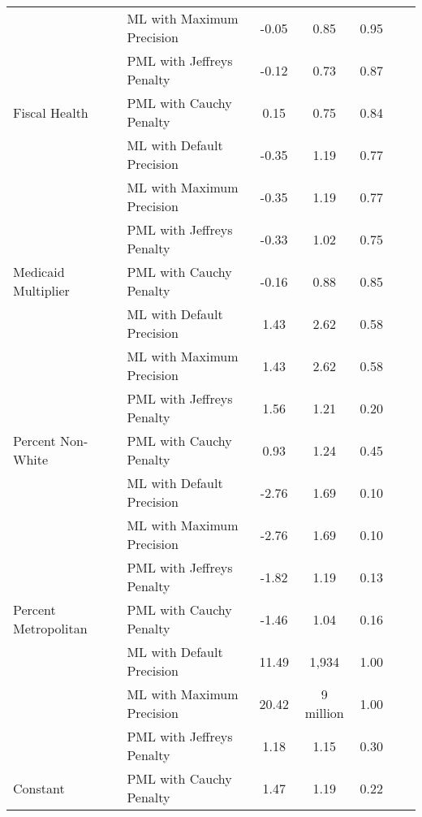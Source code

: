 \begin{tabular}{llccccc}
 & ML with Maximum Precision & -0.05 & 0.85 & 0.95 &  & \\

 & PML with Jeffreys Penalty & -0.12 & 0.73 & 0.87 &  & \\

\multirow{-4}{*}{\raggedright\arraybackslash Fiscal Health} & PML with Cauchy Penalty & 0.15 & 0.75 & 0.84 &  & \\
\cmidrule{1-7}
 & ML with Default Precision & -0.35 & 1.19 & 0.77 &  & \\

 & ML with Maximum Precision & -0.35 & 1.19 & 0.77 &  & \\

 & PML with Jeffreys Penalty & -0.33 & 1.02 & 0.75 &  & \\

\multirow{-4}{*}{\raggedright\arraybackslash Medicaid Multiplier} & PML with Cauchy Penalty & -0.16 & 0.88 & 0.85 &  & \\
\cmidrule{1-7}
 & ML with Default Precision & 1.43 & 2.62 & 0.58 &  & \\

 & ML with Maximum Precision & 1.43 & 2.62 & 0.58 &  & \\

 & PML with Jeffreys Penalty & 1.56 & 1.21 & 0.20 &  & \\

\multirow{-4}{*}{\raggedright\arraybackslash Percent Non-White} & PML with Cauchy Penalty & 0.93 & 1.24 & 0.45 &  & \\
\cmidrule{1-7}
 & ML with Default Precision & -2.76 & 1.69 & 0.10 &  & \\

 & ML with Maximum Precision & -2.76 & 1.69 & 0.10 &  & \\

 & PML with Jeffreys Penalty & -1.82 & 1.19 & 0.13 &  & \\

\multirow{-4}{*}{\raggedright\arraybackslash Percent Metropolitan} & PML with Cauchy Penalty & -1.46 & 1.04 & 0.16 &  & \\
\cmidrule{1-7}
 & ML with Default Precision & 11.49 & 1,934 & 1.00 &  & \\

 & ML with Maximum Precision & 20.42 & 9 million & 1.00 &  & \\

 & PML with Jeffreys Penalty & 1.18 & 1.15 & 0.30 &  & \\

\multirow{-4}{*}{\raggedright\arraybackslash Constant} & PML with Cauchy Penalty & 1.47 & 1.19 & 0.22 &  & \\
\bottomrule
\end{tabular}